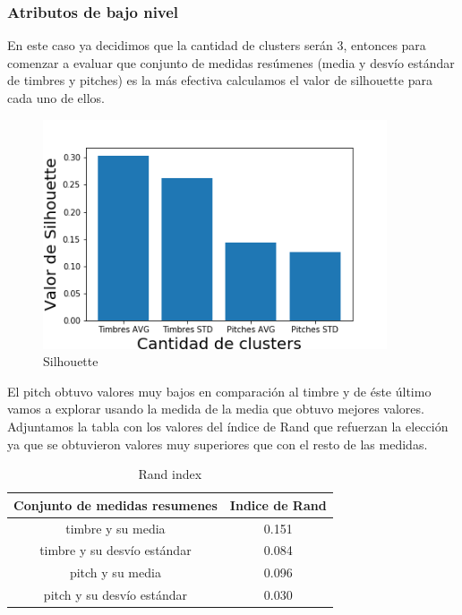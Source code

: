 \subsubsection{Atributos de bajo nivel}
En este caso ya decidimos que la cantidad de clusters serán 3, entonces para comenzar a evaluar que conjunto de medidas resúmenes (media y desvío estándar de timbres y pitches) es la más efectiva calculamos el valor de silhouette para cada uno de ellos.

\begin{figure}[H]
    \centering
    \includegraphics[width = 4in]{img/kmeans/silhouette-analysis.png}
    \caption{Silhouette}
    \label{fig:silhouette-aa-3-all}
\end{figure}

El pitch obtuvo valores muy bajos en comparación al timbre y de éste último vamos a explorar usando la medida de la media que obtuvo mejores valores. Adjuntamos la tabla con los valores del índice de Rand que refuerzan la elección ya que se obtuvieron valores muy superiores que con el resto de las medidas.

\begin{table}[H]
    \centering
    \begin{tabular}{|c|c|}
        \hline
        Conjunto de medidas resumenes & Indice de Rand \\
        \hline
        timbre y su media & 0.151 \\
        timbre y su desvío estándar & 0.084 \\
        pitch y su media & 0.096 \\
        pitch y su desvío estándar & 0.030 \\
        \hline
    \end{tabular}
    \caption{Rand index}
    \label{tab:rand-kmeans-aa-3-all}
\end{table}

